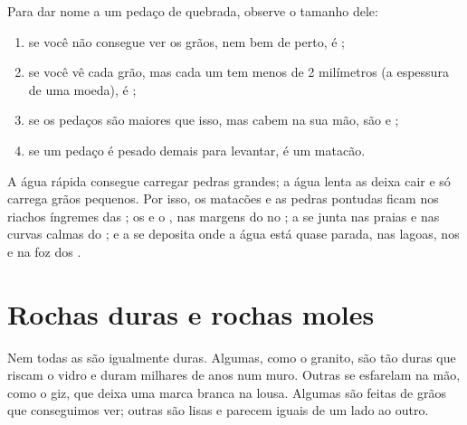 \begin{method}\label{met:g3:stones-pebbles-sand:sort}
Para dar nome a um pedaço de  quebrada, observe o tamanho dele:
\begin{enumerate}
  \item se você não consegue ver os grãos, nem bem de perto, é ;
  \item se você vê cada grão, mas cada um tem menos de 2 milímetros (a
        espessura de uma moeda), é ;
  \item se os pedaços são maiores que isso, mas cabem na sua mão, são
         e ;
  \item se um pedaço é pesado demais para levantar, é um matacão.
\end{enumerate}
\end{method}

\begin{example}\label{ex:g3:stones-pebbles-sand:where}
A água rápida consegue carregar pedras grandes; a água lenta as deixa cair
e só carrega grãos pequenos. Por isso, os matacões e as pedras pontudas
ficam nos riachos íngremes das ; os  e o , nas
margens do  no ; a  se junta nas praias e nas curvas calmas do
; e a  se deposita onde a água está quase parada, nas lagoas, nos
 e na foz dos .
\end{example}

\section{Rochas duras e rochas moles}

Nem todas as  são igualmente duras. Algumas, como o granito, são tão
duras que riscam o vidro e duram milhares de anos num muro. Outras se
esfarelam na mão, como o giz, que deixa uma marca branca na lousa. Algumas
 são feitas de grãos que conseguimos ver; outras são lisas e parecem
iguais de um lado ao outro.

